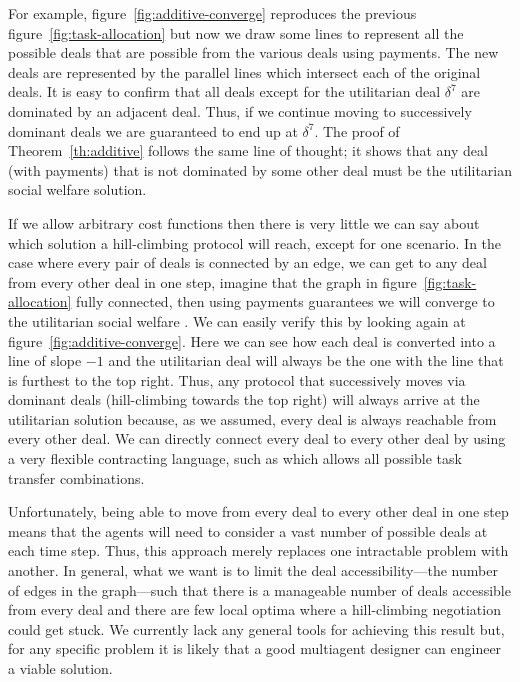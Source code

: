 For example, figure~\ref{fig:additive-converge} reproduces the
previous figure~\ref{fig:task-allocation} but now we draw some lines
to represent all the possible deals that are possible from the various
deals using payments. The new deals are represented by the parallel
lines which intersect each of the original deals. It is easy to
confirm that all deals except for the utilitarian deal $\delta^7$ are
dominated by an adjacent deal. Thus, if we continue moving to
successively dominant deals we are guaranteed to end up at $\delta^7$.
The proof of Theorem~\ref{th:additive} follows the same line of
thought; it shows that any deal (with payments) that is not dominated
by some other deal must be the utilitarian social welfare
solution.

\medskip

If we allow arbitrary cost functions then there is very little we can
say about which solution a hill-climbing protocol will reach, except
for one scenario. In the case where every pair of deals is connected
by an edge, we can get to any deal from every other deal in one step,
imagine that the graph in figure~\ref{fig:task-allocation} fully
connected, then using payments guarantees we will converge to the
utilitarian social welfare
\cite{sandholm97a,sandholm98b,andersson98a}. We can easily verify this
by looking again at figure~\ref{fig:additive-converge}. Here we can
see how each deal is converted into a line of slope $-1$ and the
utilitarian deal will always be the one with the line that is furthest
to the top right.  Thus, any protocol that successively moves via
dominant deals (hill-climbing towards the top right) will always
arrive at the utilitarian solution because, as we assumed, every deal
is always reachable from every other deal. We can directly connect
every deal to every other deal by using a very flexible contracting
language, such as  which allows all possible task
transfer combinations.

Unfortunately, being able to move from every deal to every other deal
in one step means that the agents will need to consider a vast number
of possible deals at each time step. Thus, this approach merely
replaces one intractable problem with another. In general, what we
want is to limit the deal accessibility---the number of edges in the
graph---such that there is a manageable number of deals accessible
from every deal and there are few local optima where a hill-climbing
negotiation could get stuck. We currently lack any general tools for
achieving this result but, for any specific problem it is likely that
a good multiagent designer can engineer a viable solution.

